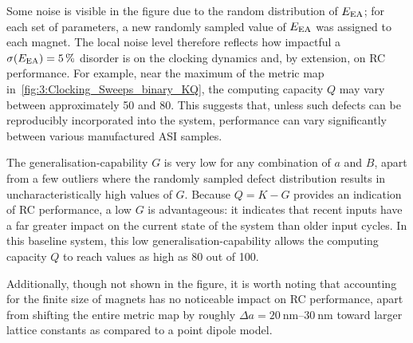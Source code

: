 Some noise is visible in the figure due to the random distribution of $E_\mathrm{EA}$; for each set of parameters, a new randomly sampled value of $E_\mathrm{EA}$ was assigned to each magnet.
The local noise level therefore reflects how impactful a $\sigma(E_\mathrm{EA}) = \SI{5}{\percent}$ disorder is on the clocking dynamics and, by extension, on RC performance.
For example, near the maximum of the metric map in~\cref{fig:3:Clocking_Sweeps_binary_KQ}, the computing capacity $Q$ may vary between approximately 50 and 80.
This suggests that, unless such defects can be reproducibly incorporated into the system, performance can vary significantly between various manufactured ASI samples. \par
The generalisation-capability $G$ is very low for any combination of $a$ and $B$, apart from a few outliers where the randomly sampled defect distribution results in uncharacteristically high values of $G$.
Because $Q=K-G$ provides an indication of RC performance, a low $G$ is advantageous: it indicates that recent inputs have a far greater impact on the current state of the system than older input cycles.
In this baseline system, this low generalisation-capability allows the computing capacity $Q$ to reach values as high as 80 out of 100. \par
Additionally, though not shown in the figure, it is worth noting that accounting for the finite size of magnets has no noticeable impact on RC performance, apart from shifting the entire metric map by roughly $\Delta a = \SIrange{20}{30}{\nano\metre}$ toward larger lattice constants as compared to a point dipole model. %

